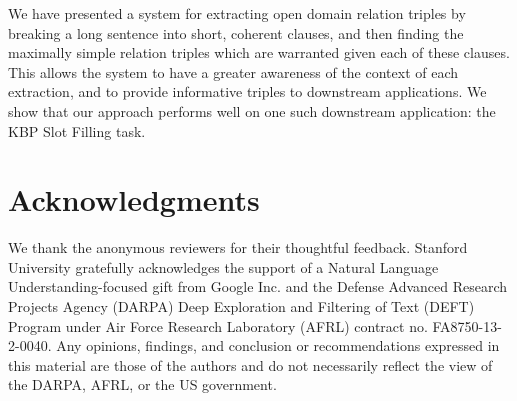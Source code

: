 We have presented a system for extracting open domain relation triples
  by breaking a long sentence into short, coherent clauses, and then
  finding the maximally simple relation triples which are warranted given
  each of these clauses.
This allows the system to have a greater awareness of the context of each
  extraction, and to provide informative triples to downstream applications.
We show that our approach performs well on one such downstream application:
  the KBP Slot Filling task.

\section*{Acknowledgments}
We thank the anonymous reviewers for their thoughtful feedback.
Stanford University gratefully acknowledges the support of a Natural Language
Understanding-focused gift from Google Inc. and the Defense
Advanced Research Projects Agency (DARPA) Deep Exploration and Filtering
of Text (DEFT) Program under Air Force Research Laboratory (AFRL)
contract no. FA8750-13-2-0040. Any opinions, findings, and conclusion or
recommendations expressed in this material are those of the authors and
do not necessarily reflect the view of the DARPA, AFRL, or the US
government.
